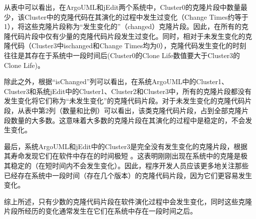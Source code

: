 从表中可以看出，在ArgoUML和jEdit两个系统中，Cluster0的克隆片段中数量最少，该Cluster中的克隆代码在其演化的过程中发生过变化（Change Times约等于1），将这些克隆片段称为“发生变化的”（changed）克隆片段。因此，在所有的克隆代码片段中仅有少量的克隆代码片段发生过变化。同时，相对于未发生变化的克隆代码（Cluster3中ischanged和Change Times均为0），克隆代码发生变化的时刻往往是其存在于系统中一段时间后(Cluster0的Clone Life数值要大于Cluster3的Clone Life)。

除此之外，根据“isChanged”列可以看出，在系统ArgoUML中的Cluster1、Cluster3和系统jEdit中的Cluster1、Cluster2和Cluster3中，所有的克隆片段都没有发生变化将它们称为“未发生变化”的克隆代码片段。对于未发生变化的克隆代码片段，从表中第2列（数量和比例）可以看出，该类克隆代码片段，占到全部克隆片段数量的大多数。这意味着大多数的克隆片段在其演化的过程中是稳定的，不会发生变化。

最后，系统ArgoUML和jEdit中的Cluster3是完全没有发生变化的克隆片段，根据其寿命发现它们在软件中存在的时间极短 。这表明刚刚出现在系统中的克隆是极其稳定的（在短时间内不会发生变化）。因此，程序开发人员应该更多地关注那些已经存在系统中一段时间（存在几个版本）的克隆代码片段，因为它们更容易发生变化。

综上所述，只有少数的克隆代码片段在软件演化过程中会发生变化，同时这些克隆片段所经历的变化通常发生在它们在系统中存在一段时间之后。


